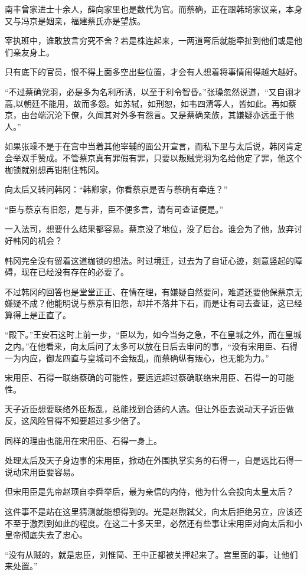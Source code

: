 南丰曾家进士十余人，薛向家里也是数代为官。而蔡确，正在跟韩琦家议亲，本身又与冯京是姻亲，福建蔡氏亦是望族。

宰执班中，谁敢放言穷究不舍？若是株连起来，一两道弯后就能牵扯到他们或是他们亲友身上。

只有底下的官员，恨不得上面多空出些位置，才会有人想着将事情闹得越大越好。

“不过蔡确党羽，必是多为名利所诱，以至于利令智昏。”张璪忽然说道，“又自诩才高,以朝廷不能用，故而多怨。如苏轼，如刑恕，如韦四清等人，皆如此。再如蔡京，由台端沉沦下僚，久闻其对外多有怨言。又是蔡确亲族，其嫌疑亦远重于他人。”

如果张璪不是于在宫中当着其他宰辅的面公开宣言，而私下里与太后说，韩冈肯定会举双手赞成。不管蔡京真有罪假有罪，只要以叛贼党羽为名给他定了罪，他这个枷锁就别想再钳制住韩冈。

向太后又转问韩冈：“韩卿家，你看蔡京是否与蔡确有牵连？”

“臣与蔡京有旧怨，是与非，臣不便多言，请有司查证便是。”

一入法司，想要什么结果都容易。蔡京没了地位，没了后台。谁会为了他，放弃讨好韩冈的机会？

韩冈完全没有留着这道枷锁的想法。时过境迁，过去为了自证心迹，刻意竖起的障碍，现在已经没有存在的必要了。

不过韩冈的回答也是堂堂正正、在情在理，有嫌疑自然要问，难道还要他保蔡京无嫌疑不成？他能明说与蔡京有旧怨，却并不落井下石，而是让有司去查证，这已经算得上是正直了。

“殿下。”王安石这时上前一步，“臣以为，如今当务之急，不在皇城之外，而在皇城之内。”在他看来，向太后问了太多可以放在日后去审问的事，“没有宋用臣、石得一为内应，御龙四直与皇城司不会叛乱，而蔡确纵有叛心，也无能为力。”

宋用臣、石得一联络蔡确的可能性，要远远超过蔡确联络宋用臣、石得一的可能性。

天子近臣想要联络外臣叛乱，总能找到合适的人选。但让外臣去说动天子近臣做反，这风险冒得不知要超过多少倍了。

同样的理由也能用在宋用臣、石得一身上。

处理太后及天子身边事的宋用臣，掀动在外围执掌实务的石得一，自是远比石得一说动宋用臣要容易。

但宋用臣是先帝赵顼自李舜举后，最为亲信的内侍，他为什么会投向太皇太后？

这件事不是站在这里猜测就能想得到的。光是赵煦弑父，向太后拒绝另立，应该还不至于激烈到如此的程度。在这二十多天里，必然还有些事让宋用臣对向太后和小皇帝彻底失去了忠心。

“没有从贼的，就是忠臣，刘惟简、王中正都被关押起来了。宫里面的事，让他们来处置。”

